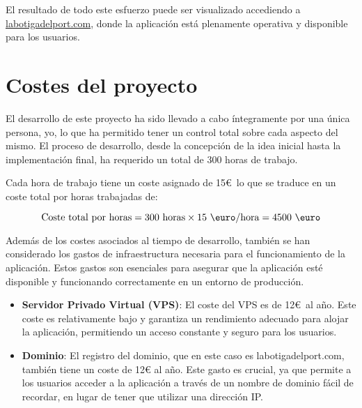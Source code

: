 \vspace{0.5cm}

El resultado de todo este esfuerzo puede ser visualizado accediendo a \href{https://labotigadelport.com}{labotigadelport.com}, donde la aplicación está plenamente operativa y disponible para los usuarios.

\section{Costes del proyecto}\label{sec:apartado}

El desarrollo de este proyecto ha sido llevado a cabo íntegramente por una única persona, yo, lo que ha permitido tener un control total sobre cada aspecto del mismo. El proceso de desarrollo, desde la concepción de la idea inicial hasta la implementación final, ha requerido un total de 300 horas de trabajo.

\vspace{0.5cm}

Cada hora de trabajo tiene un coste asignado de 15\euro\, lo que se traduce en un coste total por horas trabajadas de:

\[
\text{Coste total por horas} = 300 \text{ horas} \times 15 \text{ \euro/hora} = 4500 \text{ \euro}
\]

Además de los costes asociados al tiempo de desarrollo, también se han considerado los gastos de infraestructura necesaria para el funcionamiento de la aplicación. Estos gastos son esenciales para asegurar que la aplicación esté disponible y funcionando correctamente en un entorno de producción.

\begin{itemize}
    \item \textbf{Servidor Privado Virtual (VPS)}: El coste del VPS es de 12\euro\ al año. Este coste es relativamente bajo y garantiza un rendimiento adecuado para alojar la aplicación, permitiendo un acceso constante y seguro para los usuarios.
    
    \item \textbf{Dominio}: El registro del dominio, que en este caso es labotigadelport.com, también tiene un coste de 12€ al año. Este gasto es crucial, ya que permite a los usuarios acceder a la aplicación a través de un nombre de dominio fácil de recordar, en lugar de tener que utilizar una dirección IP.
\end{itemize}

\vspace{0.5cm}


